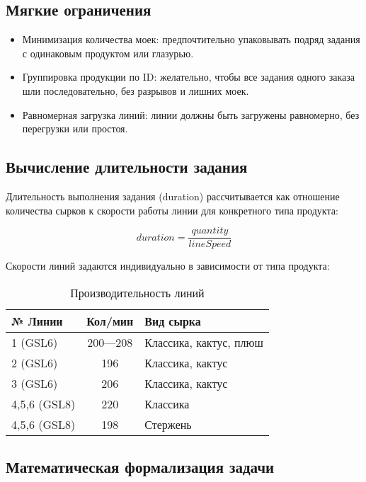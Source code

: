 \subsection{Мягкие ограничения}

\begin{itemize}
    \item Минимизация количества моек: предпочтительно упаковывать подряд задания с одинаковым продуктом или глазурью.
    \item Группировка продукции по ID: желательно, чтобы все задания одного заказа шли последовательно, без разрывов и лишних моек.
    \item Равномерная загрузка линий: линии должны быть загружены равномерно, без перегрузки или простоя.
\end{itemize}

\subsection{Вычисление длительности задания}

Длительность выполнения задания (duration) рассчитывается как отношение количества сырков к скорости работы линии для конкретного типа продукта:

\begin{equation}
    duration = \frac{quantity}{lineSpeed}
\end{equation}

Скорости линий задаются индивидуально в зависимости от типа продукта:


\begin{table}[h]
\centering
\caption{Производительность линий}
\begin{tabularx}{\textwidth}{|l|c|X|}
\hline
\textbf{№ Линии} & \textbf{ Кол/мин} & \textbf{Вид сырка} \\
\hline
1 (GSL6)     & 200—208 & Классика, кактус, плюш \\
\hline
2 (GSL6)     & 196     & Классика, кактус \\
\hline
3 (GSL6)     & 206     & Классика, кактус \\
\hline
4,5,6 (GSL8) & 220     & Классика \\
\hline
4,5,6 (GSL8) & 198     & Стержень \\
\hline
\end{tabularx}
\end{table}

\subsection{Математическая формализация задачи}


